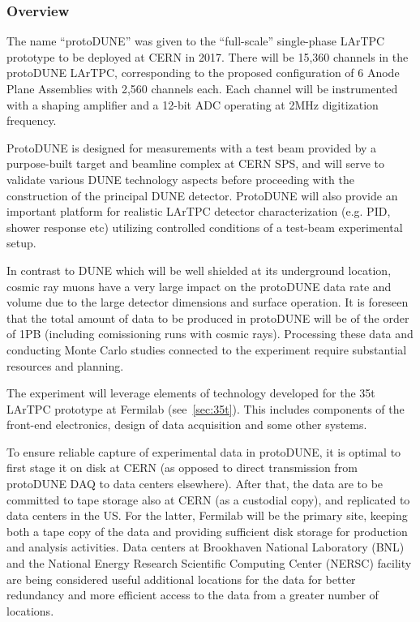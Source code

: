 \label{sec:protodune}
\subsubsection{Overview}

The name ``protoDUNE'' was given to the ``full-scale'' single-phase LArTPC prototype to be deployed at CERN in 2017.
There will be 15,360 channels in the protoDUNE LArTPC, corresponding to the proposed configuration of 6 Anode Plane Assemblies with 2,560 channels each.
Each channel will be instrumented with a shaping amplifier and a 12-bit ADC operating at 2MHz digitization frequency.

ProtoDUNE is designed for measurements with a test beam provided by a purpose-built target and beamline complex at CERN SPS,
and will serve to validate various DUNE technology aspects before proceeding with the construction of the principal DUNE detector.
ProtoDUNE will also provide an important platform for realistic LArTPC detector characterization (e.g. PID, shower response etc) utilizing
controlled conditions of a test-beam experimental setup.

In contrast to DUNE which will be well shielded at its underground location, cosmic ray muons have a very large impact on the
protoDUNE data rate and volume due to the large detector dimensions and surface operation.
It is foreseen that the total amount of data to be produced in protoDUNE will be of the
order of 1PB (including comissioning runs with cosmic rays). Processing these data and conducting
Monte Carlo studies connected to the experiment require substantial resources and planning.

The experiment will leverage elements of technology developed for the 35t LArTPC prototype at Fermilab (see~\ref{sec:35t}).
This includes components of the front-end electronics, design of data acquisition and some other systems.

To ensure reliable capture of experimental data in protoDUNE, it is optimal to first stage it on disk at CERN (as opposed to direct transmission
from protoDUNE DAQ to data centers elsewhere). After that, the data are to be committed to tape storage also at CERN (as a custodial copy),
and replicated to data centers in the US. For the latter, Fermilab will be the primary site, keeping both a tape copy of the data and providing
sufficient disk storage for production and analysis activities. Data centers at Brookhaven National Laboratory (BNL) and the
National Energy Research Scientific Computing Center (NERSC) facility are being considered useful additional locations for the data
for better redundancy and more efficient access to the data from a greater number of locations.


